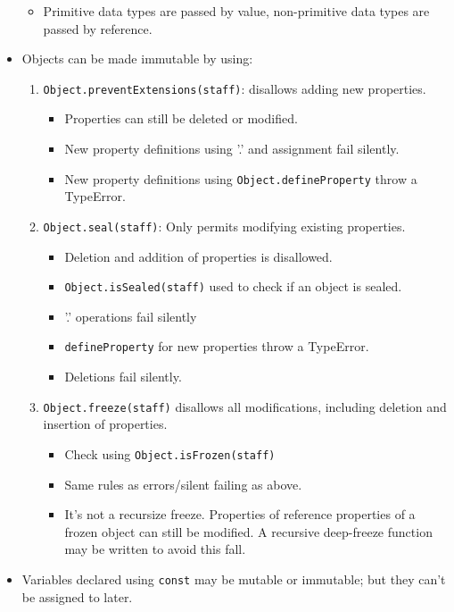\documentclass{report}
\begin{document}
\begin{itemize}
\begin{itemize}
\item Primitive data types are passed by value, non-primitive data types are passed by reference.
\end{itemize}
\item Objects can be made immutable by using:
\begin{enumerate}
\item \texttt{Object.preventExtensions(staff)}: disallows adding new properties. 
\begin{itemize}
    \item Properties can still be deleted or modified.
    \item New property definitions using '.' and assignment fail silently.
    \item New property definitions using \texttt{Object.defineProperty} throw a TypeError.
\end{itemize}
\item \texttt{Object.seal(staff)}: Only permits modifying existing properties. 
\begin{itemize}
\item Deletion and addition of properties is disallowed.
\item \texttt{Object.isSealed(staff)} used to check if an object is sealed.
\item '.' operations fail silently
\item \texttt{defineProperty} for new properties throw a TypeError.
\item Deletions fail silently.
\end{itemize}
\item \texttt{Object.freeze(staff)} disallows all modifications, including deletion and insertion of properties.
\begin{itemize}
\item Check using \texttt{Object.isFrozen(staff)}
\item Same rules as errors/silent failing as above.
\item It's not a recursize freeze. Properties of reference properties of a frozen object can still be modified. A recursive deep-freeze function may be written to avoid this fall.
\end{itemize}
\end{enumerate}
\item Variables declared using \texttt{const} may be mutable or immutable; but they can't be assigned to later.
\end{itemize}
\end{document}
